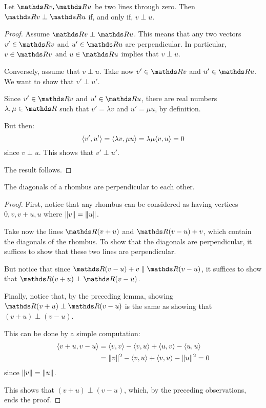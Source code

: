 \begin{lemma}
	Let $\R v,\R u$ be two lines through zero. Then $\R v\perp \R u$ if, and only if, $v\perp u$.
\end{lemma}
\begin{proof}
	Assume $\R v\perp \R u$. This means that any two vectors $v'\in \R v$ and $u'\in \R u$ are perpendicular. In particular, $v\in \R v$ and $u\in \R u$ implies that $v\perp u$.
	
	\bigskip
	Conversely, assume that $v\perp u$. Take now $v'\in \R v$ and $u'\in \R u$. We want to show that $v'\perp u'$.
	
	Since $v'\in \R v$ and $u'\in \R u$, there are real numbers $\lambda,\mu\in \R$ such that $v'=\lambda v$ and $u'=\mu u$, by definition.
	
	But then:
	\[\langle v',u'\rangle=\langle \lambda v,\mu u\rangle=\lambda\mu\langle v,u\rangle=0\] since $v\perp u$. This shows that $v'\perp u'$.
	
	The result follows.
\end{proof}
\begin{cor}
	The diagonals of a rhombus are perpendicular to each other.
\end{cor}
\begin{proof}
	First, notice that any rhombus can be considered as having vertices $0,v,v+u,u$ where $\lVert v\rVert=\lVert u\rVert$.
	
	Take now the lines $\R(v+u)$ and $\R(v-u)+v$, which contain the diagonals of the rhombus. To show that the diagonals are perpendicular, it suffices to show that these two lines are perpendicular.
	
	But notice that since $\R(v-u)+v\parallel\R(v-u)$, it suffices to show that $\R(v+u)\perp\R(v-u)$.
	
	Finally, notice that, by the preceding lemma, showing $\R(v+u)\perp\R(v-u)$ is the same as showing that $(v+u)\perp (v-u)$.
	
	This can be done by a simple computation:
	\begin{align*}
		\langle v+u,v-u\rangle&=\langle v,v\rangle-\langle v,u\rangle+\langle u,v\rangle-\langle u,u\rangle\\
		&=\lVert v\rVert^2-\langle v,u\rangle+\langle v,u\rangle-\lVert u\rVert^2=0
	\end{align*}since $\lVert v\rVert=\lVert u\rVert$.
	
	This shows that $(v+u)\perp(v-u)$, which, by the preceding observations, ends the proof.
\end{proof}

